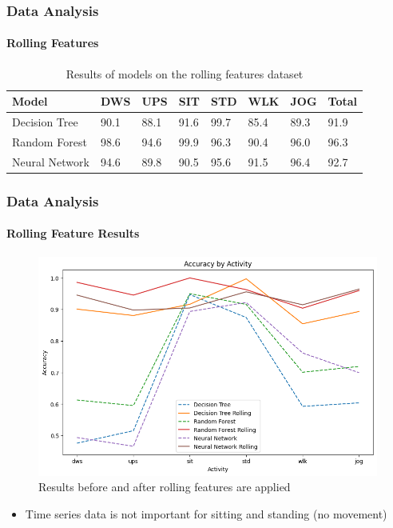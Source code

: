 \documentclass[
	11pt, %
]{beamer}
\begin{document}
\begin{frame}
    \frametitle{Data Analysis}
    \framesubtitle{Rolling Features}

    \begin{table}
		\begin{tabular}{l l l l l l l l}
			\toprule
			\textbf{Model} & \textbf{DWS} & \textbf{UPS} & \textbf{SIT} & \textbf{STD} & \textbf{WLK} & \textbf{JOG} & Total \\
			\midrule
			Decision Tree & 90.1 & 88.1 & 91.6 & 99.7 & 85.4 & 89.3 & 91.9 \\
            Random Forest & 98.6 & 94.6 & 99.9 & 96.3 & 90.4 & 96.0 & 96.3 \\
            Neural Network & 94.6 & 89.8 & 90.5 & 95.6 & 91.5 & 96.4 & 92.7 \\
			\bottomrule
		\end{tabular}
		\caption{Results of models on the rolling features dataset}
	\end{table}
\end{frame}


\begin{frame}
    \frametitle{Data Analysis}
    \framesubtitle{Rolling Feature Results}

    \begin{figure}
        \includegraphics[width=0.6\linewidth]{rolling_before_after.png}
        \caption{Results before and after rolling features are applied}
    \end{figure}

    \begin{itemize}
        \item Time series data is not important for sitting and standing (no movement)
    \end{itemize}

\end{frame}
\end{document}
